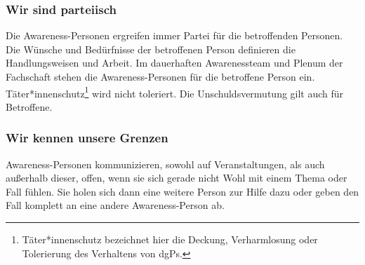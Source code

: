 \documentclass{article}
\begin{document}
\subsubsection{Wir sind parteiisch}
Die Awareness-Personen ergreifen immer Partei für die betroffenden Personen. Die Wünsche und Bedürfnisse der betroffenen Person definieren die Handlungsweisen und Arbeit. Im 
dauerhaften Awarenessteam und Plenum der Fachschaft stehen die Awareness-Personen für die betroffene Person ein. 
Täter*innenschutz\footnote{Täter*innenschutz bezeichnet hier die Deckung, Verharmlosung oder Tolerierung des Verhaltens von dgPs.} wird nicht toleriert. Die Unschuldsvermutung 
gilt auch für Betroffene.

\subsubsection{Wir kennen unsere Grenzen}
Awareness-Personen kommunizieren, sowohl auf Veranstaltungen, als auch außerhalb dieser, offen, wenn sie sich gerade nicht Wohl mit einem Thema oder Fall fühlen. Sie holen 
sich dann eine weitere Person zur Hilfe dazu oder geben den Fall komplett an eine andere Awareness-Person ab. 
\end{document}
